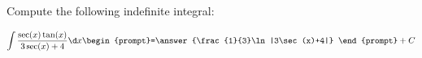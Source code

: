 \documentclass{ximera}
\author{Jim Talamo}
\begin{document}
\begin{exercise}
Compute the following indefinite integral:

\[
\int \frac{\sec(x)\tan(x)}{3\sec(x) +4} \d x 
\begin{prompt}=\answer{\frac{1}{3}\ln|3\sec(x)+4|} \end{prompt}+C
\]
\end{exercise}
\end{document}
